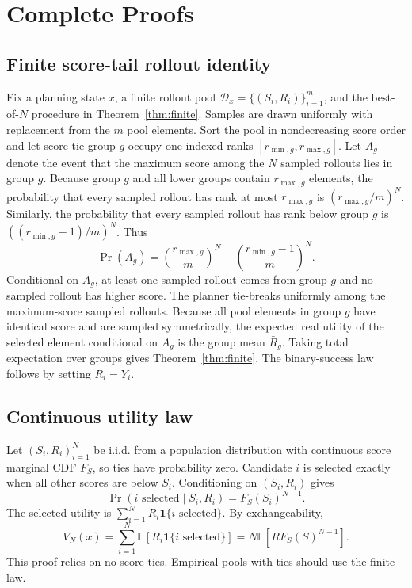 \section{Complete Proofs}
\label{app:proofs}

\subsection{Finite score-tail rollout identity}
\label{app:finite-proof}
Fix a planning state $x$, a finite rollout pool $\mathcal{D}_x=\{(S_i,R_i)\}_{i=1}^m$, and the best-of-$N$ procedure in Theorem~\ref{thm:finite}. Samples are drawn uniformly with replacement from the $m$ pool elements. Sort the pool in nondecreasing score order and let score tie group $g$ occupy one-indexed ranks $[r_{\min,g},r_{\max,g}]$. Let $A_g$ denote the event that the maximum score among the $N$ sampled rollouts lies in group $g$. Because group $g$ and all lower groups contain $r_{\max,g}$ elements, the probability that every sampled rollout has rank at most $r_{\max,g}$ is $(r_{\max,g}/m)^N$. Similarly, the probability that every sampled rollout has rank below group $g$ is $((r_{\min,g}-1)/m)^N$. Thus
\[
\Pr(A_g)
=
\left(\frac{r_{\max,g}}{m}\right)^N
-
\left(\frac{r_{\min,g}-1}{m}\right)^N.
\]
Conditional on $A_g$, at least one sampled rollout comes from group $g$ and no sampled rollout has higher score. The planner tie-breaks uniformly among the maximum-score sampled rollouts. Because all pool elements in group $g$ have identical score and are sampled symmetrically, the expected real utility of the selected element conditional on $A_g$ is the group mean $\bar R_g$. Taking total expectation over groups gives Theorem~\ref{thm:finite}. The binary-success law follows by setting $R_i=Y_i$.

\subsection{Continuous utility law}
\label{app:continuous-proof}
Let $(S_i,R_i)_{i=1}^N$ be i.i.d. from a population distribution with continuous score marginal CDF $F_S$, so ties have probability zero. Candidate $i$ is selected exactly when all other scores are below $S_i$. Conditioning on $(S_i,R_i)$ gives
\[
\Pr(i \text{ selected}\mid S_i,R_i) = F_S(S_i)^{N-1}.
\]
The selected utility is $\sum_{i=1}^N R_i \mathbf{1}\{i \text{ selected}\}$. By exchangeability,
\[
V_N(x)
=
\sum_{i=1}^N \mathbb{E}\!\left[R_i \mathbf{1}\{i \text{ selected}\}\right]
=
N\mathbb{E}\!\left[R F_S(S)^{N-1}\right].
\]
This proof relies on no score ties. Empirical pools with ties should use the finite law.

